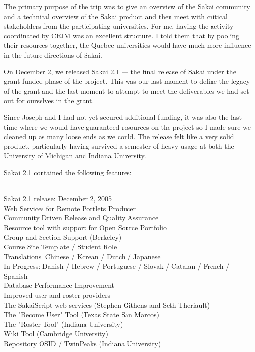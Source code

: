\documentclass[12pt]{book}
\begin{document}
The primary purpose of the trip was to
give an overview of the Sakai community and a technical
overview of the Sakai product and then meet with critical
stakeholders from the participating universities.
For me, having the activity coordinated by CRIM was an
excellent structure. I told them that by pooling their
resources together, the Quebec universities would have
much more influence in the future directions of Sakai.

On December 2, we released Sakai 2.1 --- the final
release of Sakai under the grant-funded phase of the project.  This
was our last moment to define the legacy of the grant and the last
moment to attempt to meet the deliverables we had set out for
ourselves in the grant.

Since Joseph and I had not yet secured additional funding, it was also
the last time where we would have guaranteed resources on the
project so I made sure we cleaned up as many loose ends
as we could.   The release felt like a very
solid product, particularly having survived a semester of
heavy usage at both the University of Michigan
and Indiana University.

Sakai 2.1 contained the following features:\\
\\
\begin{sf}
Sakai 2.1 release: December 2, 2005\\
Web Services for Remote Portlets Producer\\
Community Driven Release and Quality Assurance\\
Resource tool with support for Open Source Portfolio\\
Group and Section Support (Berkeley)\\
Course Site Template / Student Role\\
Translations: Chinese / Korean / Dutch / Japanese\\
In Progress: Danish / Hebrew / Portuguese /
  Slovak / Catalan / French / Spanish\\
Database Performance Improvement\\
Improved user and roster providers\\
The SakaiScript web services (Stephen Githens
  and Seth Theriault)\\
The "Become User" Tool (Texas State San Marcos)\\
The "Roster Tool" (Indiana University)\\
Wiki Tool (Cambridge University)\\
Repository OSID / TwinPeaks (Indiana University)\\
\end{sf}
\end{document}
